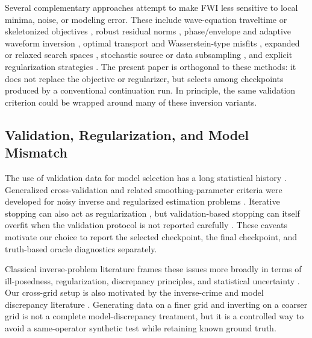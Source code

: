 \documentclass[10pt,twocolumn]{article}
\begin{document}
Several complementary approaches attempt to make FWI less sensitive to
local minima, noise, or modeling error. These include wave-equation
traveltime or skeletonized objectives
\cite{luo1991traveltime,luo1991skeletalized}, robust residual norms
\cite{ha2009huber,brossier2009l1,brossier2010norm}, phase/envelope and
adaptive waveform inversion
\cite{bozdag2011misfit,warner2016adaptive,guasch2019adaptive}, optimal
transport and Wasserstein-type misfits
\cite{engquist2014wasserstein,metivier2016otgji,metivier2016ottle,
yang2018ot}, expanded or relaxed search spaces
\cite{vanleeuwen2013mitigating,vanleeuwen2016penalty}, stochastic source
or data subsampling \cite{vanleeuwen2011stochastic}, and explicit
regularization strategies
\cite{asnaashari2013regularized,esser2018tv}. The present paper is
orthogonal to these methods: it does not replace the objective or
regularizer, but selects among checkpoints produced by a conventional
continuation run. In principle, the same validation criterion could be
wrapped around many of these inversion variants.

\subsection{Validation, Regularization, and Model Mismatch}
The use of validation data for model selection has a long statistical
history
\cite{stone1974cross,allen1974relationship,geisser1975predictive,
stone1977asymptotics,arlot2010survey}. Generalized cross-validation and
related smoothing-parameter criteria were developed for noisy inverse and
regularized estimation problems
\cite{wahba1977practical,craven1978smoothing,golub1979generalized,
wahba1990spline,hansen1992lcurve,hansen1993lcurve,hanke1996heuristic,
reginska1996regularization,kilmer2001choosing,belge2002efficient,
bauer2011comparing}. Iterative stopping can also act as regularization
\cite{prechelt1998early,zhang2005boosting,yao2007early,
raskutti2014early,hardt2016train}, but validation-based stopping can
itself overfit when the validation protocol is not reported carefully
\cite{varma2006bias,cawley2010overfitting}. These caveats motivate our
choice to report the selected checkpoint, the final checkpoint, and
truth-based oracle diagnostics separately.

Classical inverse-problem literature frames these issues more broadly in
terms of ill-posedness, regularization, discrepancy principles, and
statistical uncertainty
\cite{tikhonov1977solutions,morozov1984methods,engl1996regularization,
vogel2002computational,tarantola2005inverse,kaipio2005statistical,
hansen2010discrete,stuart2010bayesian,calvetti2018inverse}. Our
cross-grid setup is also motivated by the inverse-crime and model
discrepancy literature
\cite{kaipio2007inversecrimes,arridge2006approximation,
kennedy2001calibration,brynjarsdottir2014modeldiscrepancy,
lu2014discrepancy,banks2016difference,lieberman2010modelreduction}.
Generating data on a finer grid and inverting on a coarser grid is not a
complete model-discrepancy treatment, but it is a controlled way to avoid
a same-operator synthetic test while retaining known ground truth.
\end{document}
